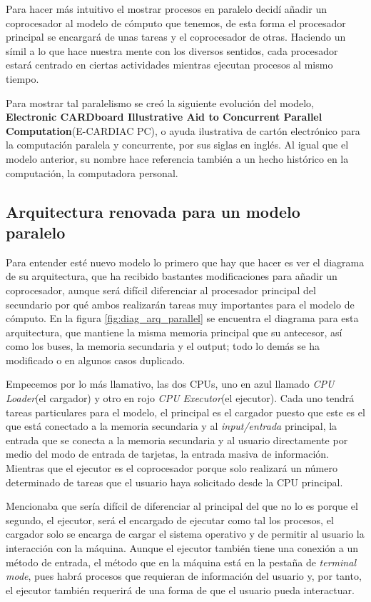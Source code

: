 \documentclass[letterpaper,12pt,oneside]{book}
\begin{document}
	 Para hacer más intuitivo el mostrar procesos en paralelo decidí añadir un coprocesador al modelo de cómputo que tenemos, de esta forma el procesador principal
	 se encargará de unas tareas y el coprocesador de otras. Haciendo un símil a lo que hace nuestra mente con los diversos sentidos, cada procesador
	 estará centrado en ciertas actividades mientras ejecutan
	 procesos al mismo tiempo.
	 
	 Para mostrar tal paralelismo se creó la siguiente evolución del modelo, \textbf{Electronic CARDboard Illustrative Aid to
	 Concurrent Parallel Computation}(E-CARDIAC PC), o ayuda ilustrativa de cartón electrónico para la computación paralela y concurrente, por
	 sus siglas en inglés. Al igual que el modelo anterior, su nombre hace referencia también a un hecho histórico en la computación, la computadora
	 personal.
	 
	 	\subsection{Arquitectura renovada para un modelo paralelo}
	 	
	 	Para entender esté nuevo modelo lo primero que hay que hacer es ver el diagrama de su arquitectura, que ha recibido bastantes modificaciones para añadir
	 	un coprocesador, aunque será difícil diferenciar al procesador principal del secundario por qué ambos realizarán tareas muy importantes
	 	para el modelo de cómputo. En la figura \ref{fig:diag_arq_parallel} se encuentra el diagrama para esta arquitectura, que mantiene la misma memoria principal
	 	que su antecesor, así como los buses, la memoria secundaria y el output; todo lo demás se ha modificado o en algunos casos duplicado. 
	 	
	 	Empecemos por lo más llamativo, las dos CPUs, uno en azul llamado \textit{CPU Loader}(el cargador) y otro en rojo \textit{CPU Executor}(el ejecutor). Cada uno tendrá tareas
	 	particulares para el modelo, el principal es el cargador puesto que este es el que está conectado a la memoria secundaria y al
	 	\textit{input/entrada} principal, la entrada que se conecta a la memoria secundaria y al usuario directamente por medio del modo de entrada de tarjetas,
	 	la entrada masiva de información. Mientras que el ejecutor es el coprocesador porque solo realizará un número
	 	determinado de tareas que el usuario haya solicitado desde la CPU principal.
   
        Mencionaba que sería difícil de diferenciar al principal del que no lo es porque el
		segundo, el ejecutor, será el encargado de ejecutar como tal los procesos, el cargador solo se encarga de cargar el sistema operativo y de permitir al usuario
		la interacción con la máquina. Aunque el ejecutor también tiene una conexión a un método de entrada, el método que en la máquina está en
		la pestaña de \textit{terminal mode}, pues habrá procesos que requieran de información del usuario y, por tanto, el ejecutor también requerirá
		de una forma de que el usuario pueda interactuar.
\end{document}
